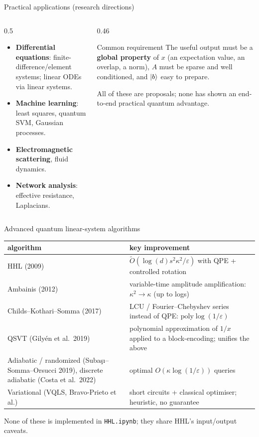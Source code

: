 \documentclass[aspectratio=169,11pt]{beamer}
\newcommand{\key}[1]{{\color{qdark}\textbf{#1}}}
\begin{document}
\begin{frame}{Practical applications (research directions)}
  \begin{columns}[T]
    \begin{column}{0.5\textwidth}
      \begin{itemize}
        \item \key{Differential equations}: finite-difference/element systems; linear ODEs via linear systems.
        \item \key{Machine learning}: least squares, quantum SVM, Gaussian processes.
        \item \key{Electromagnetic scattering}, fluid dynamics.
        \item \key{Network analysis}: effective resistance, Laplacians.
      \end{itemize}
    \end{column}
    \begin{column}{0.46\textwidth}
      \begin{block}{Common requirement}
        The useful output must be a \key{global property} of $x$ (an expectation value, an overlap, a norm), $A$ must be sparse and
        well conditioned, and $\ket b$ easy to prepare.
      \end{block}
      \small All of these are proposals; none has shown an end-to-end practical quantum advantage.
    \end{column}
  \end{columns}
\end{frame}

\begin{frame}{Advanced quantum linear-system algorithms}
  \footnotesize
  \begin{center}
  \begin{tabular}{p{4.3cm}p{8.6cm}}
    \toprule algorithm & key improvement\\ \midrule
    HHL (2009) & $\tilde O(\log(d)s^2\kappa^2/\varepsilon)$ with QPE + controlled rotation\\
    Ambainis (2012) & variable-time amplitude amplification: $\kappa^2\to\kappa$ (up to logs)\\
    Childs--Kothari--Somma (2017) & LCU / Fourier--Chebyshev series instead of QPE: $\mathrm{poly}\log(1/\varepsilon)$\\
    QSVT (Gilyén et al.\ 2019) & polynomial approximation of $1/x$ applied to a block-encoding; unifies the above\\
    Adiabatic / randomized (Suba\c{s}\i--Somma--Orsucci 2019), discrete adiabatic (Costa et al.\ 2022) & optimal $O(\kappa\log(1/\varepsilon))$ queries\\
    Variational (VQLS, Bravo-Prieto et al.) & short circuits + classical optimiser; heuristic, no guarantee\\ \bottomrule
  \end{tabular}
  \end{center}
  \small None of these is implemented in \texttt{HHL.ipynb}; they share HHL's input/output caveats.
\end{frame}
\end{document}
